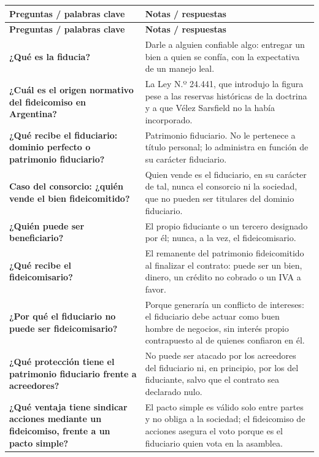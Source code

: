 \documentclass[12pt,oneside]{book}
\begin{document}
\begin{longtable}{
    >{\raggedright\arraybackslash}p{}
    >{\raggedright\arraybackslash}p{}}
\toprule
\textbf{Preguntas / palabras clave} & \textbf{Notas / respuestas} \\
\midrule
\endfirsthead
\toprule
\textbf{Preguntas / palabras clave} & \textbf{Notas / respuestas} \\
\midrule
\endhead

\textbf{¿Qué es la fiducia?} &
Darle a alguien confiable algo: entregar un bien a quien se confía, con la expectativa de un manejo leal. \\
\textbf{¿Cuál es el origen normativo del fideicomiso en Argentina?} &
La Ley N.º 24.441, que introdujo la figura pese a las reservas históricas de la doctrina y a que Vélez Sarsfield no la había incorporado. \\
\textbf{¿Qué recibe el fiduciario: dominio perfecto o patrimonio fiduciario?} &
Patrimonio fiduciario. No le pertenece a título personal; lo administra en función de su carácter fiduciario. \\
\textbf{Caso del consorcio: ¿quién vende el bien fideicomitido?} &
Quien vende es el fiduciario, en su carácter de tal, nunca el consorcio ni la sociedad, que no pueden ser titulares del dominio fiduciario. \\
\textbf{¿Quién puede ser beneficiario?} &
El propio fiduciante o un tercero designado por él; nunca, a la vez, el fideicomisario. \\
\textbf{¿Qué recibe el fideicomisario?} &
El remanente del patrimonio fideicomitido al finalizar el contrato: puede ser un bien, dinero, un crédito no cobrado o un IVA a favor. \\
\textbf{¿Por qué el fiduciario no puede ser fideicomisario?} &
Porque generaría un conflicto de intereses: el fiduciario debe actuar como buen hombre de negocios, sin interés propio contrapuesto al de quienes confiaron en él. \\
\textbf{¿Qué protección tiene el patrimonio fiduciario frente a acreedores?} &
No puede ser atacado por los acreedores del fiduciario ni, en principio, por los del fiduciante, salvo que el contrato sea declarado nulo. \\
\textbf{¿Qué ventaja tiene sindicar acciones mediante un fideicomiso, frente a un pacto simple?} &
El pacto simple es válido solo entre partes y no obliga a la sociedad; el fideicomiso de acciones asegura el voto porque es el fiduciario quien vota en la asamblea. \\

\end{longtable}
\end{document}
